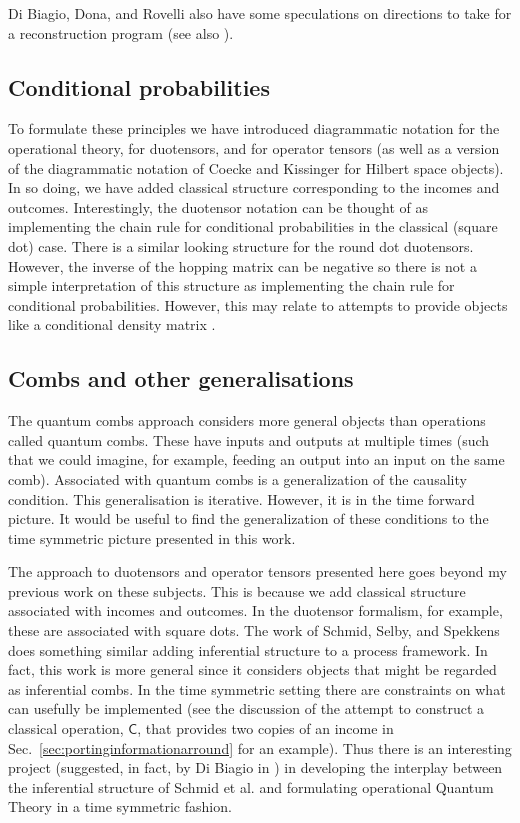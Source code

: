 \documentclass[10pt]{article}
\begin{document}
Di Biagio, Dona, and Rovelli also have some speculations on directions to take for a reconstruction program \cite{di2020quantum} (see also \cite{dibiagio2020can}).


\subsection{Conditional probabilities}


To formulate these principles we have introduced diagrammatic notation for the operational theory, for duotensors, and for operator tensors (as well as a version of the diagrammatic notation of Coecke and Kissinger for Hilbert space objects).  In so doing, we have added classical structure corresponding to the incomes and outcomes.  Interestingly, the duotensor notation can be thought of as implementing the chain rule for conditional probabilities in the classical (square dot) case.  There is a similar looking structure for the round dot duotensors. However, the inverse of the hopping matrix can be negative so there is not a simple interpretation of this structure as implementing the chain rule for conditional probabilities.  However, this may relate to attempts to provide objects like a conditional density matrix \cite{leifer2006quantum2, leifer2013towards}.


\subsection{Combs and other generalisations}

The quantum combs approach considers more general objects than operations called quantum combs.  These have inputs and outputs at multiple times (such that we could imagine, for example, feeding an output into an input on the same comb).  Associated with quantum combs is a generalization of the causality condition.  This generalisation is iterative.  However, it is in the time forward picture.  It would be useful to find the generalization of these conditions to the time symmetric picture presented in this work.

The approach to duotensors and operator tensors presented here goes beyond my previous work on these subjects.  This is because we add classical structure associated with incomes and outcomes.  In the duotensor formalism, for example, these are associated with square dots.  The work of Schmid, Selby, and Spekkens \cite{schmid2020unscrambling} does something similar adding inferential structure to a process framework.  In fact, this work is more general since it considers objects that might be regarded as inferential combs. In the time symmetric setting there are constraints on what can usefully be implemented (see the discussion of the attempt to construct a classical operation, $\mathsf C$, that provides two copies of an income in Sec.\ \ref{sec:portinginformationarround} for an example).  Thus there is an interesting project (suggested, in fact, by Di Biagio in \cite{dibiagio2020can}) in developing the interplay between the inferential structure of Schmid et al. and formulating operational  Quantum Theory in a time symmetric fashion.
\end{document}
